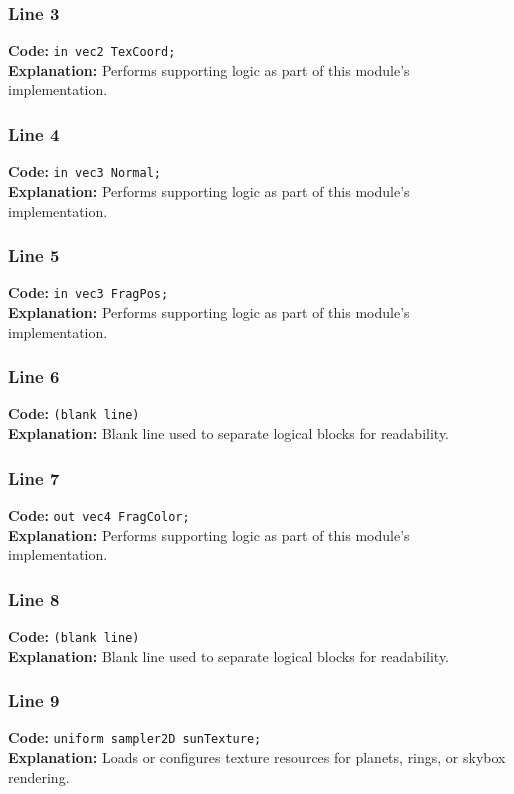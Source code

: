 \documentclass[11pt,a4paper]{article}
\begin{document}
\subsubsection*{Line 3}
\textbf{Code:} \verb|in vec2 TexCoord;|\\
\textbf{Explanation:} Performs supporting logic as part of this module's implementation.

\subsubsection*{Line 4}
\textbf{Code:} \verb|in vec3 Normal;|\\
\textbf{Explanation:} Performs supporting logic as part of this module's implementation.

\subsubsection*{Line 5}
\textbf{Code:} \verb|in vec3 FragPos;|\\
\textbf{Explanation:} Performs supporting logic as part of this module's implementation.

\subsubsection*{Line 6}
\textbf{Code:} \texttt{(blank line)}\\
\textbf{Explanation:} Blank line used to separate logical blocks for readability.

\subsubsection*{Line 7}
\textbf{Code:} \verb|out vec4 FragColor;|\\
\textbf{Explanation:} Performs supporting logic as part of this module's implementation.

\subsubsection*{Line 8}
\textbf{Code:} \texttt{(blank line)}\\
\textbf{Explanation:} Blank line used to separate logical blocks for readability.

\subsubsection*{Line 9}
\textbf{Code:} \verb|uniform sampler2D sunTexture;|\\
\textbf{Explanation:} Loads or configures texture resources for planets, rings, or skybox rendering.
\end{document}
